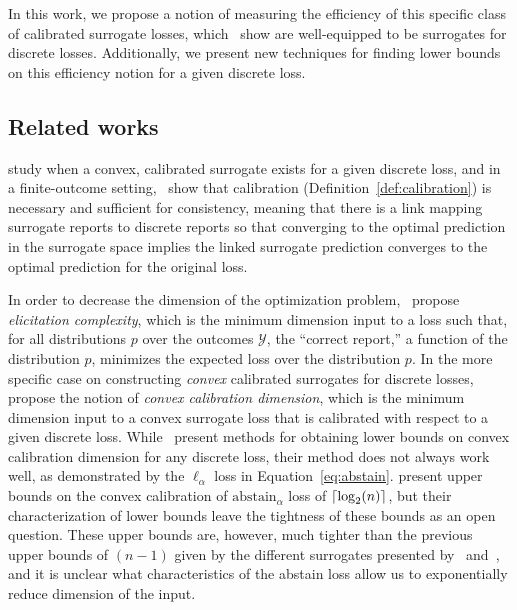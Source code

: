 \documentclass[anon]{colt2020} %
\newcommand{\abstain}[1]{\mathrm{abstain}_{#1}}
\newcommand{\Y}{\mathcal{Y}}
\newcommand{\ellabs}[1]{\ell_{#1}}
\DeclarePairedDelimiter\ceil{\lceil}{\rceil}
\begin{document}
In this work, we propose a notion of measuring the efficiency of this specific class of calibrated surrogate losses, which~\cite{finocchiaro2019embedding} show are well-equipped to be surrogates for discrete losses.
Additionally, we present new techniques for finding lower bounds on this efficiency notion for a given discrete loss.


\subsection{Related works}
\cite{bartlett2006convexity} study when a convex, calibrated surrogate exists for a given discrete loss, and in a finite-outcome setting,~\cite{tewari2007consistency} show that calibration (Definition~\ref{def:calibration}) is necessary and sufficient for consistency, meaning that there is a link mapping surrogate reports to discrete reports so that converging to the optimal prediction in the surrogate space implies the linked surrogate prediction converges to the optimal prediction for the original loss.

In order to decrease the dimension of the optimization problem,~\cite{frongillo2015elicitation} propose \emph{elicitation complexity}, which is the minimum dimension input to a loss such that, for all distributions $p$ over the outcomes $\Y$, the ``correct report,'' a function of the distribution $p$, minimizes the expected loss over the distribution $p$.
In the more specific case on constructing \emph{convex} calibrated surrogates for discrete losses,~\cite{ramaswamy2016convex} propose the notion of \emph{convex calibration dimension}, which is the minimum dimension input to a convex surrogate loss that is calibrated with respect to a given discrete loss.
While~\cite{ramaswamy2016convex} present methods for obtaining lower bounds on convex calibration dimension for any discrete loss, their method does not always work well, as demonstrated by the $\ellabs{\alpha}$ loss in Equation~\eqref{eq:abstain}.
\cite{ramaswamy2018consistent} present upper bounds on the convex calibration of $\abstain{\alpha}$ loss of $\ceil{\log_2(n)}$, but their characterization of lower bounds leave the tightness of these bounds as an open question.
These upper bounds are, however, much tighter than the previous upper bounds of $(n-1)$ given by the different surrogates presented by~\cite{crammer2001algorithmic} and~\cite{rifkin2004defense}, and it is unclear what characteristics of the abstain loss allow us to exponentially reduce dimension of the input.
\end{document}

